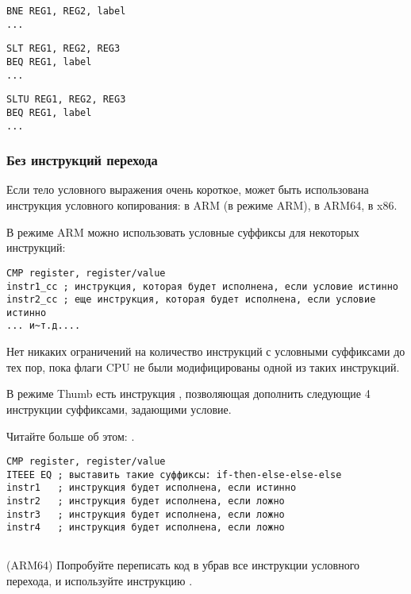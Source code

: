 \begin{lstlisting}[caption=Проверка на неравенство]
BNE REG1, REG2, label
...
\end{lstlisting}

\begin{lstlisting}[caption=Проверка на меньше{,} больше (знаковое)]
SLT REG1, REG2, REG3
BEQ REG1, label
...
\end{lstlisting}

\begin{lstlisting}[caption=Проверка на меньше{,} больше (беззнаковое)]
SLTU REG1, REG2, REG3
BEQ REG1, label
...
\end{lstlisting}

\subsubsection{Без инструкций перехода}


Если тело условного выражения очень короткое, может быть
использована инструкция условного копирования:  в ARM (в режиме ARM),  в ARM64,  в x86.


В режиме ARM можно использовать условные суффиксы для некоторых инструкций:

\begin{lstlisting}[caption=ARM (\ARMMode)]
CMP register, register/value
instr1_cc ; инструкция, которая будет исполнена, если условие истинно
instr2_cc ; еще инструкция, которая будет исполнена, если условие истинно
... и~т.д....
\end{lstlisting}

Нет никаких ограничений на количество инструкций с условными суффиксами до тех пор,
пока флаги CPU не были модифицированы одной из таких инструкций.


В режиме Thumb есть инструкция , позволяющая дополнить следующие 4 инструкции суффиксами, задающими
условие.

Читайте больше об этом: .

\begin{lstlisting}[caption=ARM (\ThumbMode)]
CMP register, register/value
ITEEE EQ ; выставить такие суффиксы: if-then-else-else-else
instr1   ; инструкция будет исполнена, если истинно
instr2   ; инструкция будет исполнена, если ложно
instr3   ; инструкция будет исполнена, если ложно
instr4   ; инструкция будет исполнена, если ложно
\end{lstlisting}

\subsection{\Exercise}

(ARM64) Попробуйте переписать код в  
убрав все инструкции условного перехода, и используйте инструкцию .

